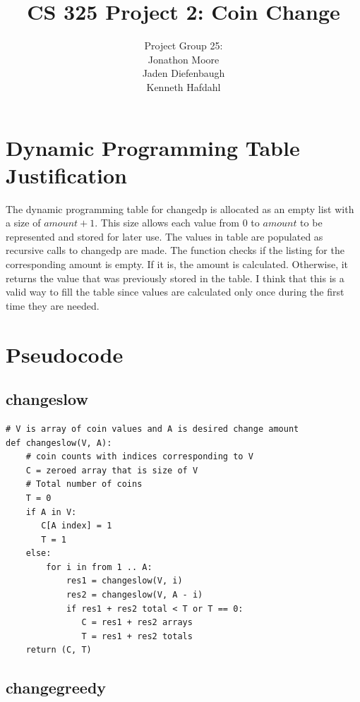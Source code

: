 \documentclass[letWterpaper,10pt,titlepage]{article}
\begin{document}
\title{CS 325 Project 2: Coin Change}
\author{Project Group 25:\\Jonathon Moore\\Jaden Diefenbaugh\\Kenneth Hafdahl}
\maketitle

\section{Dynamic Programming Table Justification}
The dynamic programming table for changedp is allocated as an empty list with a size of $amount + 1$. This size allows each value from $0$ to $amount$ to be represented and stored for later use. The values in table are populated as recursive calls to changedp are made. The function checks if the listing for the corresponding amount is empty. If it is, the amount is calculated. Otherwise, it returns the value that was previously stored in the table. I think that this is a valid way to fill the table since values are calculated only once during the first time they are needed.

\section{Pseudocode}

\subsection{changeslow}

\begin{lstlisting}
# V is array of coin values and A is desired change amount
def changeslow(V, A):
    # coin counts with indices corresponding to V
    C = zeroed array that is size of V
    # Total number of coins
    T = 0
    if A in V:
       C[A index] = 1
       T = 1
    else:
        for i in from 1 .. A:
            res1 = changeslow(V, i)
            res2 = changeslow(V, A - i)
            if res1 + res2 total < T or T == 0:
               C = res1 + res2 arrays
               T = res1 + res2 totals
    return (C, T)
\end{lstlisting}

\subsection{changegreedy}
\end{document}
